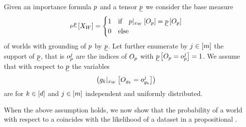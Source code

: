 \begin{assumption}
    \label{ass:independentTuples}
    Given an importance formula $p$ and a tensor $\underline{p}$ we consider the base measure
    \begin{align*}
        \nu^{\underline{p}}\left[X_{W}\right]
        = \begin{cases}
              1 & \text{if}\quad {p}|_{x_{W}} \left[O_{p}\right] = \underline{p}\left[O_{p}\right] \\
              0 & \text{else}
        \end{cases}
    \end{align*}
    of worlds with grounding of $p$ by $\underline{p}$.
    Let further enumerate by $j\in[m]$ the support of $\underline{p}$, that is $o_{p}^j$ are the indices of $O_{p}$ with $\underline{p}\left[O_{p}=o_{p}^j\right]=1$.
    We assume that with respect to $\underline{p}$ the variables
    \begin{align}
        \left({g_{k}}|_{x_{W}} \left[O_{g_{k}}=o_{g_{k}}^j\right]\right)
    \end{align}
    are for $k\in[d]$ and $j\in[m]$ independent and uniformly distributed.
\end{assumption}

When the above assumption holds, we now show that the probability of a \firstOrderLogic{} world with respect to a \HybridFOLNetwork{} coincides with the likelihood of a dataset in a propositional \HybridLogicNetwork{}.

